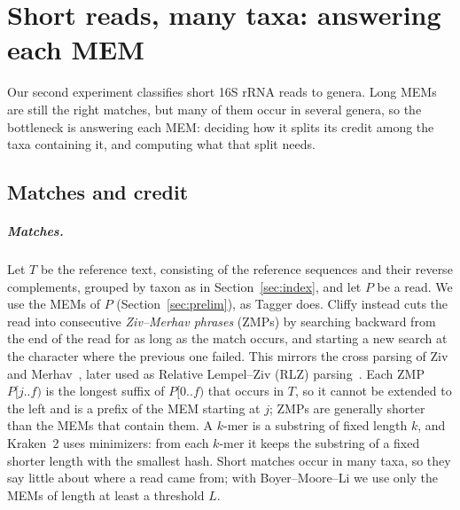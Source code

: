 \section{Short reads, many taxa: answering each MEM}
\label{sec:silva}

Our second experiment classifies short 16S rRNA reads to genera.
Long MEMs are still the right matches, but many of them occur in several genera, so the bottleneck is answering each MEM: deciding how it splits its credit among the taxa containing it, and computing what that split needs.

\subsection{Matches and credit}
\label{sec:schemes}
\label{sec:background}

\subparagraph*{Matches.}
Let $T$ be the reference text, consisting of the reference sequences and their reverse complements, grouped by taxon as in Section~\ref{sec:index}, and let $P$ be a read.
We use the MEMs of $P$ (Section~\ref{sec:prelim}), as Tagger does.
Cliffy instead cuts the read into consecutive \emph{Ziv--Merhav phrases} (ZMPs) by searching backward from the end of the read for as long as the match occurs, and starting a new search at the character where the previous one failed.
This mirrors the cross parsing of Ziv and Merhav~\cite{ZM93}, later used as Relative Lempel--Ziv (RLZ) parsing~\cite{KPZ10}.
Each ZMP $P[j..f)$ is the longest suffix of $P[0..f)$ that occurs in $T$, so it cannot be extended to the left and is a prefix of the MEM starting at $j$; ZMPs are generally shorter than the MEMs that contain them.
A $k$-mer is a substring of fixed length $k$, and Kraken~2 uses minimizers: from each $k$-mer it keeps the substring of a fixed shorter length with the smallest hash.
Short matches occur in many taxa, so they say little about where a read came from; with Boyer--Moore--Li we use only the MEMs of length at least a threshold $L$.

